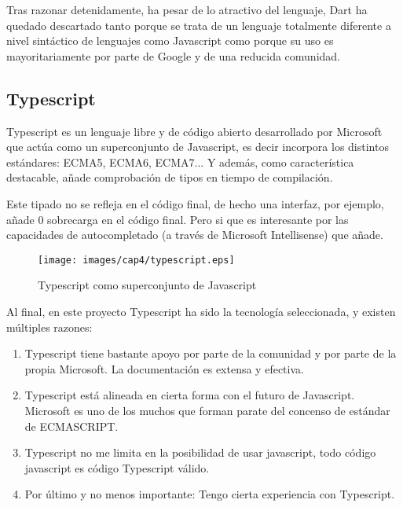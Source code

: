 \bigskip
Tras razonar detenidamente, ha pesar de lo atractivo del lenguaje, Dart ha quedado descartado tanto porque se trata de un 
lenguaje totalmente diferente a nivel sintáctico de lenguajes como Javascript como porque su uso es mayoritariamente por parte de Google y de una reducida comunidad.

\subsection{Typescript}

Typescript es un lenguaje libre y de código abierto desarrollado por Microsoft que actúa como un superconjunto
de Javascript, es decir incorpora los distintos estándares: ECMA5, ECMA6, ECMA7... Y además, como característica
destacable, añade comprobación de tipos en tiempo de compilación. \cite{Typescript}

\bigskip
Este tipado no se refleja en el código final, de hecho una interfaz, por ejemplo,
añade 0 sobrecarga en el código final. Pero si que es interesante por las capacidades de
autocompletado (a través de Microsoft Intellisense)  que añade.

\begin{figure}[!th]
\begin{center}
\texttt{[image: images/cap4/typescript.eps]}
\caption{Typescript como superconjunto de Javascript}
\label{fig:Typescript como superconjunto de Javascript}
\end{center}
\end{figure}

\bigskip
Al final, en este proyecto Typescript ha sido la tecnología seleccionada, y existen múltiples
razones:

\begin{enumerate}

\item Typescript tiene bastante apoyo por parte de la comunidad y por parte de la propia Microsoft.
La documentación es extensa y efectiva.

\item Typescript está alineada en cierta forma con el futuro de Javascript. Microsoft es uno de los 
muchos que forman parate del concenso de estándar de ECMASCRIPT.

\item Typescript no me limita en la posibilidad de usar javascript, todo código javascript es código
Typescript válido.

\item Por último y no menos importante: Tengo cierta experiencia con Typescript.
\end{enumerate}

